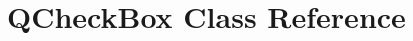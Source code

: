 \hypertarget{classGUI_1_1QtGui_1_1QCheckBox}{}\section{Q\+Check\+Box Class Reference}
\label{classGUI_1_1QtGui_1_1QCheckBox}
